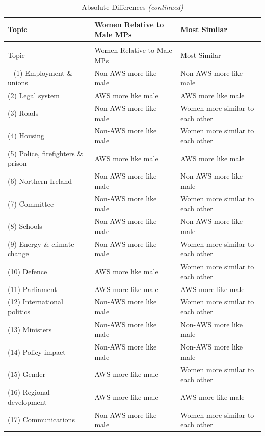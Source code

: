 \documentclass[]{article}
\theoremstyle{definition}
\theoremstyle{definition}
\theoremstyle{definition}
\theoremstyle{remark}
\begin{document}
\begin{longtabu} to 
\caption{\label{tab:absolute-differences}Absolute Differences}\\
\toprule
Topic & Women Relative to Male MPs & Most Similar\\
\midrule
\endfirsthead
\caption[]{\label{tab:absolute-differences}Absolute Differences \textit{(continued)}}\\
\toprule
Topic & Women Relative to Male MPs & Most Similar\\
\midrule
\endhead
\
\endfoot
\bottomrule
\endlastfoot
(1) Employment \& unions & Non-AWS more like male & Non-AWS more like male\\
(2) Legal system & AWS more like male & AWS more like male\\
(3) Roads & Non-AWS more like male & Women more similar to each other\\
(4) Housing & Non-AWS more like male & Women more similar to each other\\
(5) Police, firefighters \& prison & AWS more like male & AWS more like male\\
\addlinespace
(6) Northern Ireland & Non-AWS more like male & Non-AWS more like male\\
(7) Committee & Non-AWS more like male & Women more similar to each other\\
(8) Schools & Non-AWS more like male & Non-AWS more like male\\
(9) Energy \& climate change & Non-AWS more like male & Women more similar to each other\\
(10) Defence & AWS more like male & Women more similar to each other\\
\addlinespace
(11) Parliament & AWS more like male & AWS more like male\\
(12) International politics & Non-AWS more like male & Women more similar to each other\\
(13) Ministers & Non-AWS more like male & Non-AWS more like male\\
(14) Policy impact & Non-AWS more like male & Non-AWS more like male\\
(15) Gender & AWS more like male & Women more similar to each other\\
\addlinespace
(16) Regional development & AWS more like male & AWS more like male\\
(17) Communications & Non-AWS more like male & Women more similar to each other\\

\end{longtabu}
\end{document}
